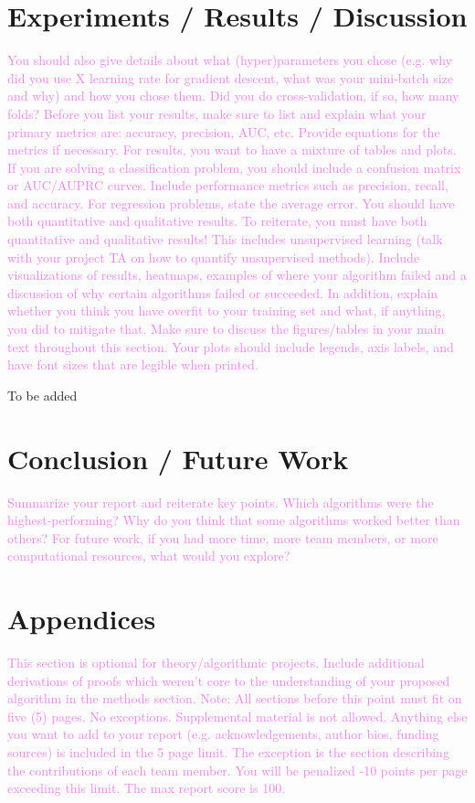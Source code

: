 \documentclass{article}
\newcommand{\instructions}[1]{\textcolor{violet}{{#1}}}
\begin{document}
\section{Experiments / Results / Discussion}
\instructions{%
You should also give details about what (hyper)parameters you chose (e.g. why did you use X learning rate for gradient descent, what was your mini-batch size and why) and how you chose them. Did you do cross-validation, if so, how many folds? Before you list your results, make sure to list and explain what your primary metrics are: accuracy, precision, AUC, etc. Provide equations for the metrics if necessary. For results, you want to have a mixture of tables and plots. If you are solving a classification problem, you should include a confusion matrix or AUC/AUPRC curves. Include performance metrics such as precision, recall, and accuracy. For regression problems, state the average error. You should have both quantitative and qualitative results. To reiterate, you must have both quantitative and qualitative results! This includes unsupervised learning (talk with your project TA on how to quantify unsupervised methods). Include visualizations of results, heatmaps, examples of where your algorithm failed and a discussion of why certain algorithms failed or succeeded. In addition, explain whether you think you have overfit to your training set and what, if anything, you did to mitigate that. Make sure to discuss the figures/tables in your main text throughout this section. Your plots should include legends, axis labels, and have font sizes that are legible when printed.
}

To be added


\section{Conclusion / Future Work}
\instructions{%
Summarize your report and reiterate key points. Which algorithms were the highest-performing? Why do you think that some algorithms worked better than others? For future work, if you had more time, more team members, or more computational resources, what would you explore?
}

\section{Appendices}
\instructions{%
This section is optional for theory/algorithmic projects. Include additional derivations of proofs which weren’t core to the understanding of your proposed algorithm in the methods section.
Note: All sections before this point must fit on five (5) pages. No exceptions. Supplemental material is not allowed. Anything else you want to add to your report (e.g. acknowledgements, author bios, funding sources) is included in the 5 page limit. The exception is the section describing the contributions of each team member. You will be penalized -10 points per page exceeding this limit. The max report score is 100.
}
\end{document}

